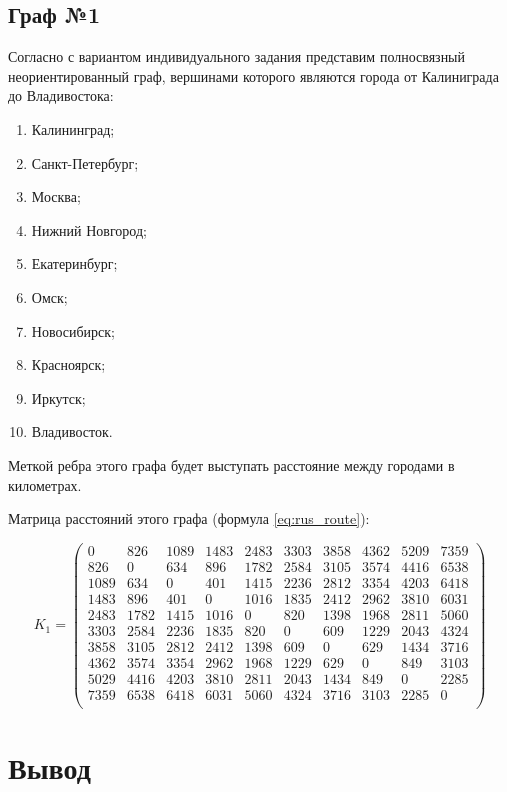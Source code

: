 \subsection{Граф №1}

Согласно с вариантом индивидуального задания представим полносвязный неориентированный граф, вершинами которого являются города от Калиниграда до Владивостока:

\begin{enumerate}[label={\arabic*)}]
	\label{list:cities}
	\item Калининград;
	\item Санкт-Петербург;
	\item Москва;
	\item Нижний Новгород;
	\item Екатеринбург;
	\item Омск;
	\item Новосибирск;
	\item Красноярск;
	\item Иркутск;
	\item Владивосток.
\end{enumerate}

Меткой ребра этого графа будет выступать расстояние между городами в километрах.

Матрица расстояний этого графа (формула \ref{eq:rus_route}):

\begin{equation}
	\label{eq:rus_route}
	K_1 = 
	\begin{pmatrix}
		0 & 826 & 1089 & 1483 & 2483 & 3303 & 3858 & 4362 & 5209 & 7359 \\ 
		826 & 0 & 634 & 896 & 1782 & 2584 & 3105 & 3574 & 4416 & 6538 \\
		1089 & 634 & 0 & 401 & 1415 & 2236 & 2812  & 3354 & 4203 & 6418 \\
		1483 & 896 & 401 & 0 & 1016  & 1835 & 2412  &  2962 & 3810 & 6031 \\
		2483 & 1782 & 1415 & 1016 & 0  & 820 & 1398  &  1968 & 2811 & 5060 \\
		3303 & 2584 & 2236 & 1835 & 820  & 0 &  609  &  1229 & 2043 & 4324 \\
		3858 & 3105 & 2812 & 2412 & 1398  & 609 &  0  &  629 & 1434 & 3716 \\
		4362 & 3574 & 3354 & 2962 & 1968  & 1229 &  629  &  0 & 849  & 3103 \\
		5029 & 4416 & 4203 & 3810 & 2811  & 2043 &  1434  &  849 & 0  & 2285 \\
		7359 & 6538 & 6418 & 6031 & 5060  & 4324 &  3716  &  3103 & 2285  & 0 \\
	\end{pmatrix}
\end{equation}

\clearpage

\section*{Вывод}


